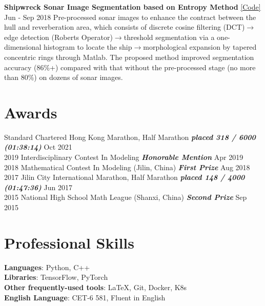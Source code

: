 \documentclass{my_cv}
\begin{document}
\hspace*{\fill} 

\noindent \textbf{Shipwreck Sonar Image Segmentation based on Entropy Method} \href{https://github.com/SuperBruceJia/Sonar-Image-Segmentation-through-Entropy-Method}{[Code]} \hfill Jun - Sep 2018 
\workitemstwo
{Pre-processed sonar images to enhance the contract between the hull and reverberation area, which consists of discrete cosine filtering (DCT)$\rightarrow$edge detection (Roberts Operator)$\rightarrow$threshold segmentation via a one-dimensional histogram to locate the ship$\rightarrow$morphological expansion by tapered concentric rings through Matlab.}
{The proposed method improved segmentation accuracy (86\%+) compared with that without the pre-processed stage (no more than 80\%) on dozens of sonar images.}

\hspace*{\fill} 

\section{Awards}

 Standard Chartered Hong Kong Marathon, Half Marathon \textbf{\emph{placed 318 / 6000 (01:38:14)}} \hfill Oct 2021\\
2019 Interdisciplinary Contest In Modeling \textbf{\emph{Honorable Mention}} \hfill Apr 2019\\
2018 Mathematical Contest In Modeling (Jilin, China) \textbf{\emph{First Prize}} \hfill Aug 2018\\
2017 Jilin City International Marathon, Half Marathon \textbf{\emph{placed 148 / 4000 (01:47:36)}} \hfill Jun 2017\\
2015 National High School Math League (Shanxi, China) \textbf{\emph{Second Prize}} \hfill Sep 2015

\hspace*{\fill}

\section{Professional Skills}
\noindent \textbf{Languages}: Python, C++ \\
\textbf{Libraries}: TensorFlow, PyTorch \\
\textbf{Other frequently-used tools}: \LaTeX, Git, Docker, K8s \\
\textbf{English Language}: CET-6 581, Fluent in English
\end{document}
